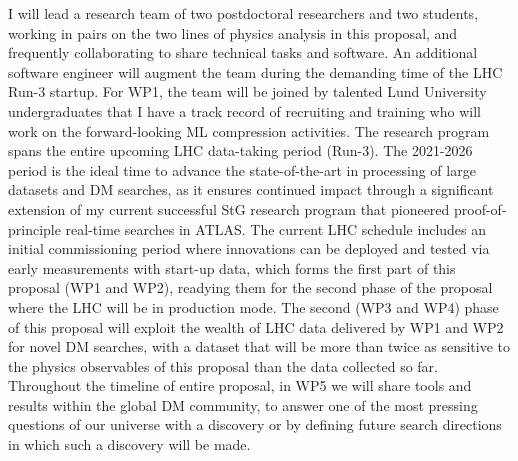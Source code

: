 \documentclass[11pt,a4paper]{article}
\begin{document}
I will lead a research team of two postdoctoral researchers and two students, working in pairs on the two lines of physics analysis in this proposal, and frequently collaborating to share technical tasks and software. An additional software engineer will augment the team during the demanding time of the LHC Run-3 startup. 
For WP1, the team will be joined by talented Lund University undergraduates that I have a track record of recruiting and training who will work on the forward-looking ML compression activities.
The research program spans the entire upcoming LHC data-taking period (Run-3).
The 2021-2026 period is the ideal time to advance the state-of-the-art in processing of large datasets and DM searches, as it ensures continued impact through a significant extension of my current successful StG research program that pioneered proof-of-principle real-time searches in ATLAS. 
The current LHC schedule includes an initial commissioning period where innovations can be deployed and tested via early measurements with start-up data, which forms the first part of this proposal (WP1 and WP2), readying them for the second phase of the proposal where the LHC will be in production mode.   
The second (WP3 and WP4) phase of this proposal will exploit the wealth of LHC data delivered by WP1 and WP2 for novel DM searches, with a dataset that will be more than \color{red}twice \color{black} as sensitive to the physics observables of this proposal than the data collected so far. 
Throughout the timeline of entire proposal, in WP5 we will share tools and results within the global DM community, to answer one of the most pressing questions of our universe with a discovery or by defining future search directions in which such a discovery will be made. 


\end{document}
